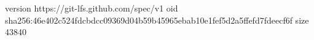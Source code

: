 version https://git-lfs.github.com/spec/v1
oid sha256:46e402c524fdcbdcc09369d04b59b45965ebab10e1fef5d2a5ffefd7fdeecf6f
size 43840
